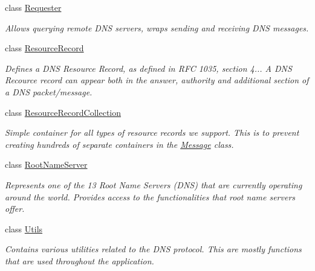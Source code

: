 \begin{DoxyCompactItemize}
class \hyperlink{class_senergy_1_1_dns_1_1_requester}{Requester}
\begin{DoxyCompactList}\small\item\em Allows querying remote D\-N\-S servers, wraps sending and receiving D\-N\-S messages. \end{DoxyCompactList}\item 
class \hyperlink{class_senergy_1_1_dns_1_1_resource_record}{Resource\-Record}
\begin{DoxyCompactList}\small\item\em Defines a D\-N\-S Resource Record, as defined in R\-F\-C 1035, section 4... A D\-N\-S Recource record can appear both in the answer, authority and additional section of a D\-N\-S packet/message. \end{DoxyCompactList}\item 
class \hyperlink{class_senergy_1_1_dns_1_1_resource_record_collection}{Resource\-Record\-Collection}
\begin{DoxyCompactList}\small\item\em Simple container for all types of resource records we support. This is to prevent creating hundreds of separate containers in the \hyperlink{class_senergy_1_1_dns_1_1_message}{Message} class. \end{DoxyCompactList}\item 
class \hyperlink{class_senergy_1_1_dns_1_1_root_name_server}{Root\-Name\-Server}
\begin{DoxyCompactList}\small\item\em Represents one of the 13 Root Name Servers (D\-N\-S) that are currently operating around the world. Provides access to the functionalities that root name servers offer. \end{DoxyCompactList}\item 
class \hyperlink{class_senergy_1_1_dns_1_1_utils}{Utils}
\begin{DoxyCompactList}\small\item\em Contains various utilities related to the D\-N\-S protocol. This are mostly functions that are used throughout the application. \end{DoxyCompactList}\end{DoxyCompactItemize}
